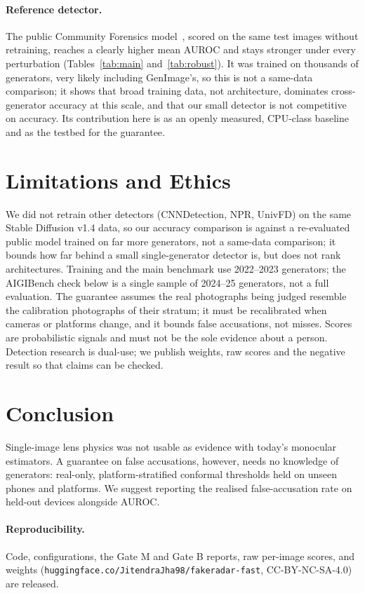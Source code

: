 \documentclass[10pt,twocolumn]{article}
\begin{document}
\paragraph{Reference detector.} The public Community Forensics
model~\cite{park2025community}, scored on the same test images without
retraining, reaches a clearly higher mean AUROC and stays stronger under
every perturbation (Tables~\ref{tab:main} and~\ref{tab:robust}). It was
trained on thousands of generators, very likely including GenImage's, so this
is not a same-data comparison; it shows that broad training data, not
architecture, dominates cross-generator accuracy at this scale, and that our
small detector is not competitive on accuracy. Its contribution here is as an
openly measured, CPU-class baseline and as the testbed for the guarantee.

\section{Limitations and Ethics}
We did not retrain other detectors (CNNDetection, NPR, UnivFD) on the same
Stable Diffusion v1.4 data, so our accuracy comparison is against a
re-evaluated public model trained on far more generators, not a same-data
comparison; it bounds how far behind a small single-generator detector is,
but does not rank architectures.
Training and the main benchmark use 2022--2023 generators; the AIGIBench
check below is a single sample of 2024--25 generators, not a full evaluation. The guarantee assumes the real photographs being judged
resemble the calibration photographs of their stratum; it must be
recalibrated when cameras or platforms change, and it bounds false
accusations, not misses. Scores are probabilistic signals and must not be the
sole evidence about a person. Detection research is dual-use; we publish
weights, raw scores and the negative result so that claims can be checked.

\section{Conclusion}
Single-image lens physics was not usable as evidence with today's monocular
estimators. A guarantee on false accusations, however, needs no knowledge of
generators: real-only, platform-stratified conformal thresholds held on unseen
phones and platforms. We suggest reporting the realised false-accusation rate
on held-out devices alongside AUROC.

\paragraph{Reproducibility.} Code, configurations, the Gate M and Gate B
reports, raw per-image scores, and weights
(\texttt{huggingface.co/JitendraJha98/fakeradar-fast}, CC-BY-NC-SA-4.0) are
released.



\end{document}
